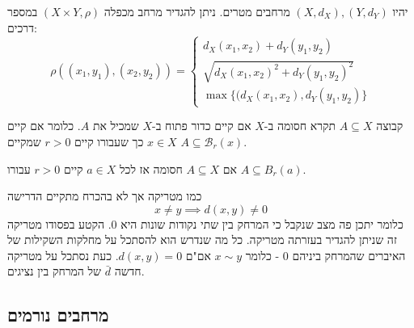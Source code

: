 \documentclass{tstextbook}
\begin{document}
\begin{definition}
יהיו \((X,d_{X}),\left( Y,d_{Y} \right)\) מרחבים מטרים. ניתן להגדיר מרחב מכפלה \(\left( X\times Y,\rho \right)\) במספר דרכים: 
$$\rho((x_{1},y_{1}),(x_{2},y_{2}))=\begin{cases}d_{X}(x_{1},x_{2})+d_{Y}(y_{1},y_{2}) \\\sqrt{d_{X}(x_{1},x_{2})^{2}+d_{Y}(y_{1},y_{2})^{2}} \\\max\{(d_{X}(x_{1},x_{2}),d_{Y}(y_{1},y_{2})\}
\end{cases}$$

\end{definition}
\begin{definition}
קבוצה \(A\subseteq X\) תקרא חסומה ב-\(X\) אם קיים כדור פתוח ב-\(X\) שמכיל את \(A\). כלומר אם קיים \(x \in X\) כך שעבורו קיים \(r>0\) שמקיים \(A\subseteq \mathcal{B}_{r}(x)\).

\end{definition}
\begin{lemma}
אם \(A\subseteq X\) חסומה אז לכל \(a\in X\) קיים \(r>0\) עבורו \(A\subseteq B_{r}(a)\). 

\end{lemma}
\begin{definition}
כמו מטריקה אך לא בהכרח מתקיים הדרישה
$$x\neq y\implies d(x,y)\neq 0$$
כלומר יתכן פה מצב שנקבל כי המרחק בין שתי נקודות שונות היא 0. 
הקטע בפסודו מטריקה זה שניתן להגדיר בעזרתה מטריקה. כל מה שנדרש הוא להסתכל על מחלקות השקילות של האיברים שהמרחק ביניהם 0 - כלומר \(x\sim y\) אם"ם \(d(x,y)=0\).
כעת נסתכל על מטריקה חדשה \(\bar{d}\) של המרחק בין נציגים.

\end{definition}
\subsection{מרחבים נורמים}
\end{document}
